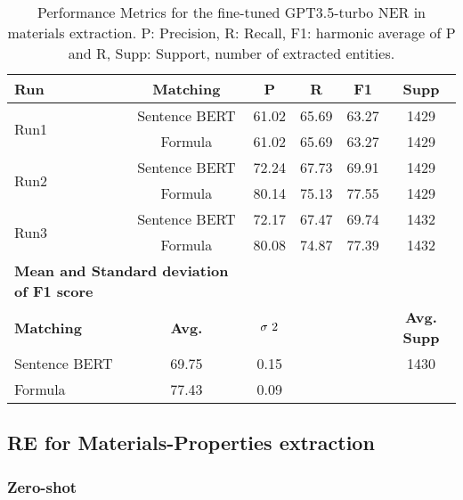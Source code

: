 \begin{table}[htbp]
\small
  \centering
  \caption{Performance Metrics for the fine-tuned GPT3.5-turbo NER in materials extraction. P: Precision, R: Recall, F1: harmonic average of P and R, Supp: Support, number of extracted entities.}
  \begin{tabular}{lccccc}
    \toprule
    \textbf{Run} & \textbf{Matching} & \textbf{P} & \textbf{R} & \textbf{F1} & \textbf{Supp} \\
    \midrule
    \multirow{2}{*}{Run1} & Sentence BERT & 61.02 & 65.69 & 63.27 & 1429 \\
    & Formula & 61.02 & 65.69 & 63.27 & 1429 \\
    \midrule
    \multirow{2}{*}{Run2} & Sentence BERT & 72.24 & 67.73 & 69.91 & 1429 \\
    & Formula & 80.14 & 75.13 & 77.55 & 1429 \\
    \midrule
    \multirow{2}{*}{Run3} & Sentence BERT & 72.17 & 67.47 & 69.74 & 1432 \\
    & Formula & 80.08 & 74.87 & 77.39 & 1432 \\
    \midrule
    \multicolumn{2}{l}{\textbf{Mean and Standard deviation of F1 score}} & & & & \\
    \midrule
    \textbf{Matching} & \textbf{Avg.} & $\sigma\textsuperscript{2}$ & & & \textbf{Avg. Supp}\\
    Sentence BERT & 69.75 & 0.15 & & & 1430 \\
    Formula & 77.43 & 0.09 & & & \\
    \bottomrule
  \end{tabular}
\end{table}

\clearpage
\subsection{RE for Materials-Properties extraction}

\subsubsection{Zero-shot}

